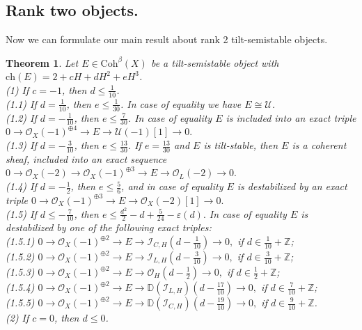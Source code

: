 \documentclass{amsart}
\newtheorem{theorem}{Theorem}[section]
\begin{document}
	\subsection{Rank two objects.}\label{rank 2}
	Now we can formulate our main result about rank 2 tilt-semistable objects. 
	
	\begin{theorem}\label{main}Let $E\in\mathrm{Coh}^\beta(X)$ be a tilt-semistable object with $\mathrm{ch}(E)=2+cH+dH^2+eH^3$.\\
		(1) If $c=-1$, then $d\le \frac{1}{10}$. \\
		(1.1) If $d=\frac{1}{10}$, then $e\le \frac{1}{30}$. In case of equality we have $E\cong\mathcal U$.\\
		(1.2) If $d=-\frac{1}{10}$, then $e\le\frac{7}{30}$. In case of equality $E$ is included into an exact triple
		$0\to\mathcal O_X(-1)^{\oplus 4}\to E\to \mathcal U(-1)[1]\to 0.$\\
		(1.3) If $d=-\frac{3}{10}$, then $e\le\frac{13}{30}$.
		If $e=\frac{13}{30}$ and $E$ is tilt-stable, then $E$ is a coherent sheaf, included into an exact sequence
		$0\to \mathcal O_X(-2)\to\mathcal O_X(-1)^{\oplus 3}\to E\to\mathcal O_L(-2)\to 0.$\\
		(1.4) If $d=-\frac 12$, then $e\le\frac 56$, and in case of equality $E$ is destabilized by an exact triple
		$0\to \mathcal O_X(-1)^{\oplus 3}\to E\to\mathcal O_X(-2)[1]\to 0.$\\
		(1.5) If $d\le-\frac{7}{10}$, then $e\le\frac{d^2}{2}-d+\frac{5}{24}-\varepsilon(d).$ In case of equality $E$ is destabilized by one of the following exact triples:\\
		(1.5.1) $0\to \mathcal O_X(-1)^{\oplus 2}\to E\to\mathcal I_{C,H}(d-\frac{1}{10})\to 0,$ if $d\in\frac{1}{10}+\mathbb Z$;\\
		(1.5.2) $0\to \mathcal O_X(-1)^{\oplus 2}\to E\to\mathcal I_{L,H}(d-\frac{3}{10})\to 0,$ if $d\in\frac{3}{10}+\mathbb Z$;\\
		(1.5.3) $0\to \mathcal O_X(-1)^{\oplus 2}\to E\to\mathcal O_H(d-\frac 12)\to 0,$ if $d\in\frac 12+\mathbb Z$;\\
		(1.5.4) $0\to \mathcal O_X(-1)^{\oplus 2}\to E\to \mathbb D(\mathcal I_{L,H})(d-\frac{17}{10})\to 0,$ if $d\in\frac{7}{10}+\mathbb Z$;\\
		(1.5.5) $0\to \mathcal O_X(-1)^{\oplus 2}\to E\to \mathbb D(\mathcal I_{C,H})(d-\frac{19}{10})\to 0,$ if $d\in\frac{9}{10}+\mathbb Z$.\\
		(2) If $c=0$, then $d\le 0$.\\

\end{theorem}
\end{document}

